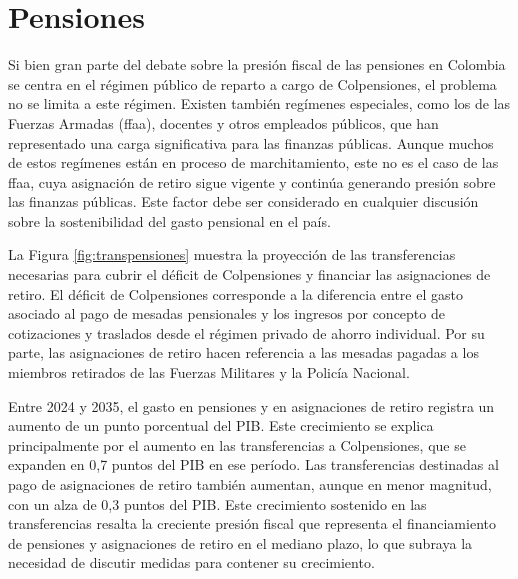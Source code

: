 
\section{Pensiones}

Si bien gran parte del debate sobre la presión fiscal de las pensiones en Colombia se centra en el régimen público de reparto a cargo de Colpensiones, el problema no se limita a este régimen. Existen también regímenes especiales, como los de las Fuerzas Armadas (\gls{ffaa}), docentes y otros empleados públicos, que han representado una carga significativa para las finanzas públicas. Aunque muchos de estos regímenes están en proceso de marchitamiento, este no es el caso de las \gls{ffaa}, cuya asignación de retiro sigue vigente y continúa generando presión sobre las finanzas públicas. Este factor debe ser considerado en cualquier discusión sobre la sostenibilidad del gasto pensional en el país.



La Figura \ref{fig:transpensiones} muestra la proyección de las transferencias necesarias para cubrir el déficit de Colpensiones y financiar las asignaciones de retiro. El déficit de Colpensiones corresponde a la diferencia entre el gasto asociado al pago de mesadas pensionales y los ingresos por concepto de cotizaciones y traslados desde el régimen privado de ahorro individual. Por su parte, las asignaciones de retiro hacen referencia a las mesadas pagadas a los miembros retirados de las Fuerzas Militares y la Policía Nacional. 

Entre 2024 y 2035, el gasto en pensiones y en asignaciones de retiro registra un aumento de un punto porcentual del PIB. Este crecimiento se explica principalmente por el aumento en las transferencias a Colpensiones, que se expanden en 0,7 puntos del PIB en ese período. Las transferencias destinadas al pago de asignaciones de retiro también aumentan, aunque en menor magnitud, con un alza de 0,3 puntos del PIB. Este crecimiento sostenido en las transferencias resalta la creciente presión fiscal que representa el financiamiento de pensiones y asignaciones de retiro en el mediano plazo, lo que subraya la necesidad de discutir medidas para contener su crecimiento.

